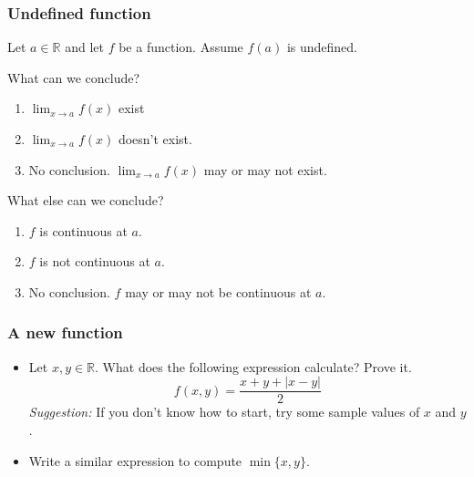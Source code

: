 \begin{frame}[t]
	\frametitle{Undefined function}
	\fontsize{13}{13}\selectfont Let $a \in \mathbb{R}$ and let $f$ be a function.
	Assume $f(a)$ is undefined.

	\vfill

	\begin{block}{What can we conclude?}
		\begin{enumerate}
			\item $\displaystyle \lim_{x \to a}f(x)$ exist

			\item $\displaystyle \lim_{x \to a}f(x)$ doesn't exist.

			\item No conclusion. $\displaystyle \lim_{x \to a}f(x)$ may or may not
				exist.
		\end{enumerate}
	\end{block}

	\vfill

	\begin{block}{What else can we conclude?}
		\begin{enumerate}
			\addtocounter{enumi}{3}

			\item $f$ is continuous at $a$.

			\item $f$ is not continuous at $a$.

			\item No conclusion. $f$ may or may not be continuous at $a$.
		\end{enumerate}
	\end{block}

	\vfill
\end{frame}

\begin{frame}
	\frametitle{A new function}

	\begin{itemize}
		\item Let $x, y \in \mathbb{R}$. What does the following expression
			calculate? Prove it.
			\[
				f(x,y) = \frac{x + y + |x - y|}{2}
			\]
			\emph{Suggestion:} If you don't know how to start, try some sample values
			of $x$ and $y$.
			\vfill

		\item Write a similar expression to compute $\displaystyle \min \{ x, y \}$.
	\end{itemize}
	\vfill
\end{frame}

